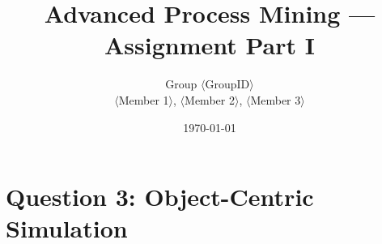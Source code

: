 
\title{Advanced Process Mining --- Assignment Part I}
\author{Group $\langle$GroupID$\rangle$ \\ $\langle$Member 1$\rangle$, $\langle$Member 2$\rangle$, $\langle$Member 3$\rangle$}
\date{\today}


\maketitle
\tableofcontents
\newpage

% 

% 

\section{Question 3: Object-Centric Simulation}











